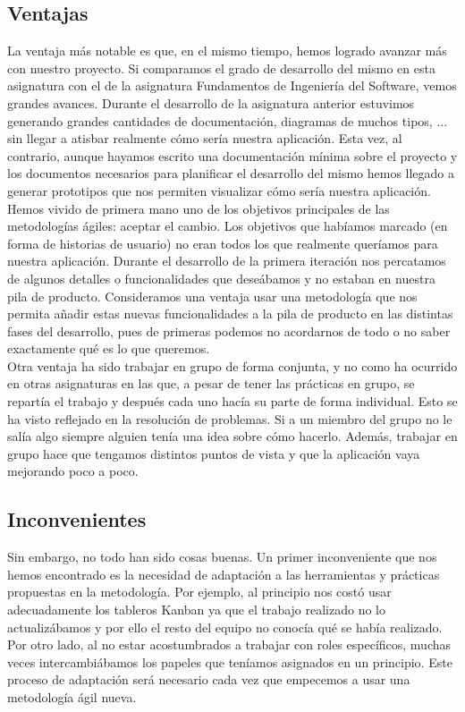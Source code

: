 \documentclass[11pt]{article}
\begin{document}
\subsection*{Ventajas}
La ventaja más notable es que, en el mismo tiempo, hemos logrado avanzar más con nuestro proyecto. Si comparamos el grado de desarrollo del mismo en esta asignatura con el de la asignatura Fundamentos de Ingeniería del Software, vemos grandes avances. Durante el desarrollo de la asignatura anterior estuvimos generando grandes cantidades de documentación, diagramas de muchos tipos, ... sin llegar a atisbar realmente cómo sería nuestra aplicación. Esta vez, al contrario, aunque hayamos escrito una documentación mínima sobre el proyecto y los documentos necesarios para planificar el desarrollo del mismo hemos llegado a generar prototipos que nos permiten visualizar cómo sería nuestra aplicación.\\

Hemos vivido de primera mano uno de los objetivos principales de las metodologías ágiles: aceptar el cambio. Los objetivos que habíamos marcado (en forma de historias de usuario) no eran todos los que realmente queríamos para nuestra aplicación. Durante el desarrollo de la primera iteración nos percatamos de algunos detalles o funcionalidades que deseábamos y no estaban en nuestra pila de producto. Consideramos una ventaja usar una metodología que nos permita añadir estas nuevas funcionalidades a la pila de producto en las distintas fases del desarrollo, pues de primeras podemos no acordarnos de todo o no saber exactamente qué es lo que queremos.\\

Otra ventaja ha sido trabajar en grupo de forma conjunta, y no como ha ocurrido en otras asignaturas en las que, a pesar de tener las prácticas en grupo, se repartía el trabajo y después cada uno hacía su parte de forma individual. Esto se ha visto reflejado en la resolución de problemas. Si a un miembro del grupo no le salía algo siempre alguien tenía una idea sobre cómo hacerlo. Además, trabajar en grupo hace que tengamos distintos puntos de vista y que la aplicación vaya mejorando poco a poco.

\subsection*{Inconvenientes}

Sin embargo, no todo han sido cosas buenas. Un primer inconveniente que nos hemos encontrado es la necesidad de adaptación a las herramientas y prácticas propuestas en la metodología. Por ejemplo, al principio nos costó usar adecuadamente los tableros Kanban ya que el trabajo realizado no lo actualizábamos y por ello el resto del equipo no conocía qué se había realizado. Por otro lado, al no estar acostumbrados a trabajar con roles específicos, muchas veces intercambiábamos los papeles que teníamos asignados en un principio. Este proceso de adaptación será necesario cada vez que empecemos a usar una metodología ágil nueva. \\
\end{document}

